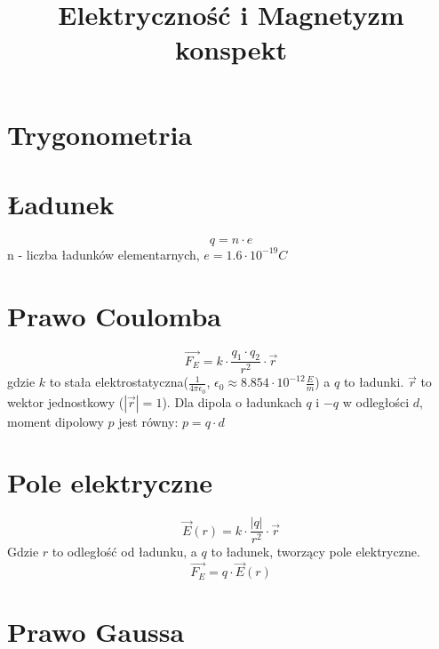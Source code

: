 \documentclass{../konspekt}
\title{Elektryczność i Magnetyzm konspekt}
\begin{document}
\begin{multicols}{2}

  \begin{multicols}{2}

    \section{Trygonometria}

    \section{Ładunek}

    $$
    q = n \cdot e
    $$
    n - liczba ładunków elementarnych, $e = 1.6 \cdot 10^{-19} C$

  \end{multicols}

  \section{Prawo Coulomba}

  $$
  \vec{F_E} = k \cdot \frac{q_1 \cdot q_2}{r^2} \cdot \vec{r}
  $$
  gdzie $k$ to stała elektrostatyczna($\frac{1}{4\pi\epsilon_0}$,
  $\epsilon_0\approx8.854\cdot10^{-12}\frac{E}{m}$) a $q$ to ładunki.
  $\vec{r}$ to wektor jednostkowy ($|\vec{r}|=1$).
  Dla dipola o ładunkach $q$ i $-q$ w odległości $d$, moment dipolowy
  $p$ jest równy: $p = q \cdot d$

  \section{Pole elektryczne}

  $$
  \vec{E}(r) = k \cdot \frac{|q|}{r^2} \cdot \vec{r}
  $$
  Gdzie $r$ to odległość od ładunku, a $q$ to ładunek, tworzący pole
  elektryczne.
  $$
  \vec{F_E} = q \cdot \vec{E}(r)
  $$

  \section{Prawo Gaussa}


\end{multicols}
\end{document}
